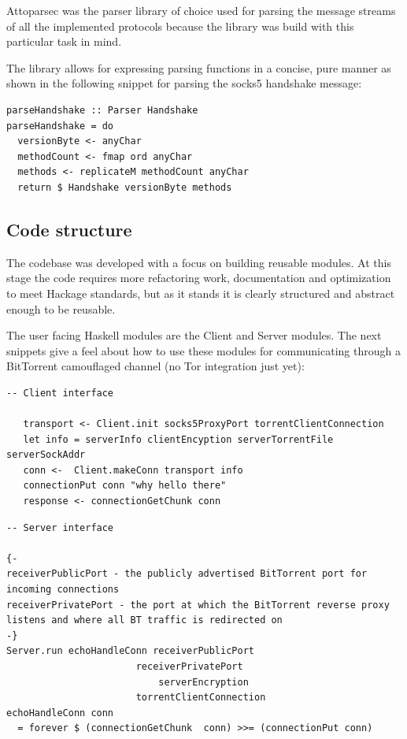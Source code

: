 \documentclass[11pt]{article} %
\begin{document}
Attoparsec was the parser library of choice used for parsing the message streams of all the implemented protocols because the library was build with this particular task in mind.

The library allows for expressing parsing functions in a concise, pure manner as shown in the following snippet for parsing the socks5 handshake message:

\begin{lstlisting}
parseHandshake :: Parser Handshake
parseHandshake = do
  versionByte <- anyChar
  methodCount <- fmap ord anyChar
  methods <- replicateM methodCount anyChar
  return $ Handshake versionByte methods
\end{lstlisting}

\subsection{Code structure}

The codebase was developed with a focus on building reusable modules. At this stage the code requires more refactoring work, documentation and optimization to meet Hackage standards, but as it stands it is clearly structured and abstract enough to be reusable.

The user facing Haskell modules are the Client and Server modules. The next snippets give a feel about how to use these modules for communicating through a BitTorrent camouflaged channel (no Tor integration just yet):

\begin{lstlisting}
-- Client interface

   transport <- Client.init socks5ProxyPort torrentClientConnection
   let info = serverInfo clientEncyption serverTorrentFile serverSockAddr
   conn <-  Client.makeConn transport info
   connectionPut conn "why hello there"
   response <- connectionGetChunk conn
\end{lstlisting}

\begin{lstlisting}
-- Server interface

{-
receiverPublicPort - the publicly advertised BitTorrent port for incoming connections
receiverPrivatePort - the port at which the BitTorrent reverse proxy listens and where all BT traffic is redirected on
-}
Server.run echoHandleConn receiverPublicPort
					   receiverPrivatePort
				           serverEncryption
					   torrentClientConnection	
echoHandleConn conn
  = forever $ (connectionGetChunk  conn) >>= (connectionPut conn)
\end{lstlisting}
\end{document}
